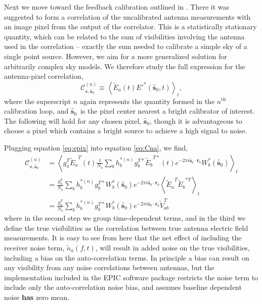 \documentclass[a4paper,fleqn,usenatbib]{../mnras}
\newcommand{\Nant}{\ensuremath{N_{\mathrm{a}}}}
\newcommand{\spix}{\ensuremath{\hat{\mathbf{s}}_{0}}}
\newcommand{\Cna}[1][n]{\ensuremath{\mathcal{C}^{(#1)}_{a,\spix}}}
\newcommand{\rb}{\ensuremath{\mathbf{r}_b}}
\newcommand{\beamtheta}{\ensuremath{W}}
\newcommand{\Er}[1]{\ensuremath{\widetilde{E}_{#1}}}
\newcommand{\V}{\ensuremath{\widetilde{V}}}
\begin{document}
Next we move toward the feedback calibration outlined in \citealt{mor11}. There it was suggested to form a correlation of the uncalibrated antenna measurements with an image pixel from the output of the correlator. This is a statistically stationary quantity, which can be related to the sum of visibilities involving the antenna used in the correlation -- exactly the sum needed to calibrate a simple sky of a single point source. However, we aim for a more generalized solution for arbitrarily complex sky models. We therefore study the full expression for the antenna-pixel correlation,
\begin{equation}\label{eq:Cna}
\Cna \equiv \left<\Er{a}(t) E'^*(\spix,t)\right>_t,
\end{equation}
where the superscript $n$ again represents the quantity formed in the $n^\mathrm{th}$ calibration loop, and \spix\, is the pixel center nearest a bright calibrator of interest. The following will hold for any chosen pixel, \spix, though it is advantageous to choose a pixel which contains a bright source to achieve a high signal to noise. 

Plugging equation \ref{eq:epix} into equation \ref{eq:Cna}, we find,
\begin{align}\label{eq:cna}
\Cna & = \left<g^T_a \Er{a}^T(t) \frac{1}{\Nant} \sum_b h^{*(n)}_b g^{T*}_b\Er{b}^{T*}(t) e^{-2\pi i \spix \cdot \rb} \beamtheta^*_b(\spix)\right>_t \nonumber \\
& = \frac{g^T_a}{\Nant} \sum_b h^{*(n)}_b g^{T*}_b \beamtheta^*_b(\spix) e^{-2\pi i \spix \cdot \rb} \left<\Er{a}^T \Er{b}^{*T} \right>_t \nonumber \\
& = \frac{g^T_a}{\Nant} \sum_b h^{*(n)}_b g^{T*}_b \beamtheta^*_b(\spix) e^{-2\pi i \spix \cdot \rb} \V^T_{ab}
\end{align}
where in the second step we group time-dependent terms, and in the third we define the true visibilities as the correlation between true antenna electric field measurements. It is easy to see from here that the net effect of including the receiver noise term, $\widetilde{n}_a(f,t)$, will result in added noise on the true visibilities, including a bias on the auto-correlation terms. In principle a bias can result on any visibility from any noise correlations between antennas, but the implementation included in the EPIC software package restricts the noise term to include only the auto-correlation noise bias, and assumes baseline dependent noise {\bf has} zero mean.
\end{document}
